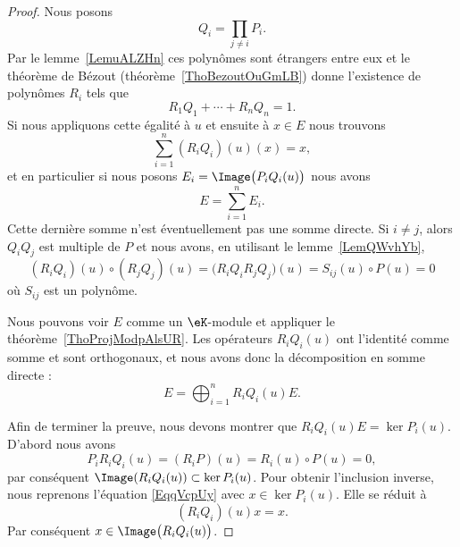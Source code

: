 \begin{proof}
    Nous posons
    \begin{equation}
        Q_i=\prod_{j\neq i}P_i.
    \end{equation}
    Par le lemme~\ref{LemuALZHn} ces polynômes sont étrangers entre eux et le théorème de Bézout (théorème~\ref{ThoBezoutOuGmLB}) donne l'existence de polynômes \( R_i\) tels que
    \begin{equation}
        R_1Q_1+\cdots+R_nQ_n=1.
    \end{equation}
    Si nous appliquons cette égalité à \( u\) et ensuite à \( x\in E\) nous trouvons
    \begin{equation}        \label{EqqVcpUy}
        \sum_{i=1}^n(R_iQ_i)(u)(x)=x,
    \end{equation}
    et en particulier si nous posons \( E_i=\Image\big(P_iQ_i(u)\big)\) nous avons
    \begin{equation}
        E=\sum_{i=1}^nE_i.
    \end{equation}
    Cette dernière somme n'est éventuellement pas une somme directe. Si \( i\neq j\), alors \( Q_iQ_j\) est multiple de \( P\) et nous avons, en utilisant le lemme~\ref{LemQWvhYb},
    \begin{equation}
        (R_iQ_i)(u)\circ (R_jQ_j)(u)=\big( R_iQ_iR_jQ_j \big)(u)=S_{ij}(u)\circ P(u)=0
    \end{equation}
    où \( S_{ij}\) est un polynôme.

    Nous pouvons voir \( E\) comme un \( \eK\)-module et appliquer le théorème~\ref{ThoProjModpAlsUR}. Les opérateurs \( R_iQ_i(u)\) ont l'identité comme somme et sont orthogonaux, et nous avons donc la décomposition en somme directe :
    \begin{equation}
        E=\bigoplus_{i=1}^nR_iQ_i(u)E.
    \end{equation}

    Afin de terminer la preuve, nous devons montrer que \( R_iQ_i(u)E=\ker P_i(u)\). D'abord nous avons
    \begin{equation}
        P_iR_iQ_i(u)=(R_iP)(u)=R_i(u)\circ P(u)=0,
    \end{equation}
    par conséquent \( \Image(R_iQ_i(u))\subset \ker P_i(u)\). Pour obtenir l'inclusion inverse, nous reprenons l'équation \eqref{EqqVcpUy} avec \( x\in\ker P_i(u)\). Elle se réduit à
    \begin{equation}
        (R_iQ_i)(u)x=x.
    \end{equation}
    Par conséquent \( x\in\Image\big( R_iQ_i(u) \big)\).
\end{proof}

